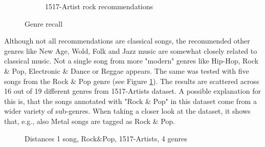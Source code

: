 \begin{figure}[htbp]
{{\begin{subfigure}{.495\textwidth}
				\caption{1517-Artist rock recommendations}
				\label{fig:genrerec2}
			\end{subfigure}		
	}}
	\caption{Genre recall}
	\label{fig:1517gen}
\end{figure}

\noindent Although not all recommendations are classical songs, the recommended other genres like New Age, Wold, Folk and Jazz music are somewhat closely related to classical music. Not a single song from more "modern" genres like Hip-Hop, Rock \& Pop, Electronic \& Dance or Reggae appears.
\noindent The same was tested with five songs from the Rock \& Pop genre (see Figure \ref{fig:genrerec2}). The results are scattered across 16 out of 19 different genres from 1517-Artists dataset. A possible explanation for this is, that the songs annotated with "Rock \& Pop" in this dataset come from a wider variety of sub-genres. When taking a closer look at the dataset, it shows that, e.g., also Metal songs are tagged as Rock \& Pop.\\
\begin{figure}[htbp]
	\centering
	\caption{Distances 1 song, Rock\&Pop, 1517-Artists, 4 genres}
	\label{fig:corr5}
\end{figure}
\FloatBarrier

